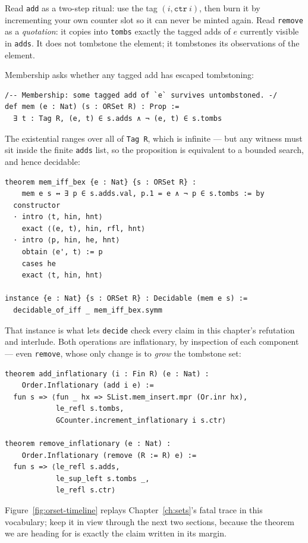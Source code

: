 \documentclass[12pt, a4paper, openright]{book}
\theoremstyle{thmstyle}
\theoremstyle{defstyle}
\newcommand{\lc}[1]{\texttt{#1}}
\newcounter{refutation}[chapter]
\newcommand{\lean}[1]{\texttt{#1}}
\begin{document}
Read \lc{add} as a two-step ritual: use the tag $(i, \lean{ctr}\ i)$,
then burn it by incrementing your own counter slot so it can never be
minted again. Read \lc{remove} as a \emph{quotation}: it copies into
\lc{tombs} exactly the tagged adds of $e$ currently visible in
\lc{adds}. It does not tombstone the element; it tombstones its
observations of the element.

Membership asks whether any tagged add has escaped tombstoning:

\begin{verbatim}
/-- Membership: some tagged add of `e` survives untombstoned. -/
def mem (e : Nat) (s : ORSet R) : Prop :=
  ∃ t : Tag R, (e, t) ∈ s.adds ∧ ¬ (e, t) ∈ s.tombs
\end{verbatim}

The existential ranges over all of \lc{Tag R}, which is infinite ---
but any witness must sit inside the finite \lc{adds} list, so the
proposition is equivalent to a bounded search, and hence decidable:

\begin{verbatim}
theorem mem_iff_bex {e : Nat} {s : ORSet R} :
    mem e s ↔ ∃ p ∈ s.adds.val, p.1 = e ∧ ¬ p ∈ s.tombs := by
  constructor
  · intro ⟨t, hin, hnt⟩
    exact ⟨(e, t), hin, rfl, hnt⟩
  · intro ⟨p, hin, he, hnt⟩
    obtain ⟨e', t⟩ := p
    cases he
    exact ⟨t, hin, hnt⟩

instance {e : Nat} {s : ORSet R} : Decidable (mem e s) :=
  decidable_of_iff _ mem_iff_bex.symm
\end{verbatim}

That instance is what lets \lc{decide} check every claim in this
chapter's refutation and interlude. Both operations are inflationary,
by inspection of each component --- even \lc{remove}, whose only change
is to \emph{grow} the tombstone set:

\begin{verbatim}
theorem add_inflationary (i : Fin R) (e : Nat) :
    Order.Inflationary (add i e) :=
  fun s => ⟨fun _ hx => SList.mem_insert.mpr (Or.inr hx),
            le_refl s.tombs,
            GCounter.increment_inflationary i s.ctr⟩

theorem remove_inflationary (e : Nat) :
    Order.Inflationary (remove (R := R) e) :=
  fun s => ⟨le_refl s.adds,
            le_sup_left s.tombs _,
            le_refl s.ctr⟩
\end{verbatim}

Figure~\ref{fig:orset-timeline} replays Chapter~\ref{ch:sets}'s fatal
trace in this vocabulary; keep it in view through the next two sections,
because the theorem we are heading for is exactly the claim written in
its margin.
\end{document}

